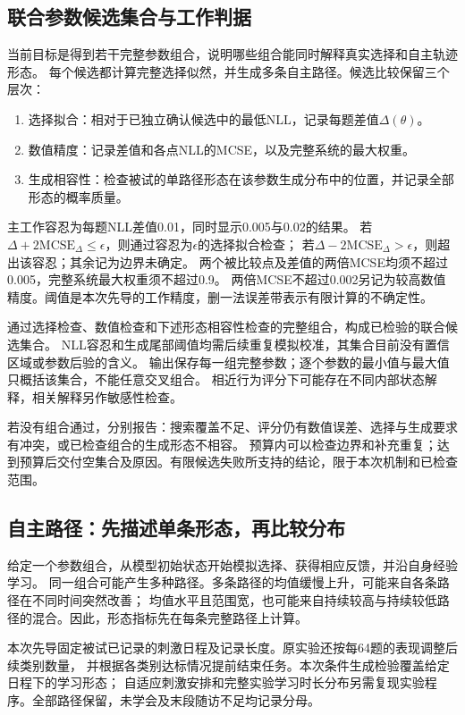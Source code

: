 \documentclass[11pt,a4paper]{article}
\numberwithin{equation}{section}
\begin{document}
\subsection{联合参数候选集合与工作判据}
\label{sec:selection}
当前目标是得到若干完整参数组合，说明哪些组合能同时解释真实选择和自主轨迹形态。
每个候选都计算完整选择似然，并生成多条自主路径。候选比较保留三个层次：
\begin{enumerate}
\item 选择拟合：相对于已独立确认候选中的最低NLL，记录每题差值$\Delta(\theta)$。
\item 数值精度：记录差值和各点NLL的MCSE，以及完整系统的最大权重。
\item 生成相容性：检查被试的单路径形态在该参数生成分布中的位置，并记录全部形态的概率质量。
\end{enumerate}
主工作容忍为每题NLL差值0.01，同时显示0.005与0.02的结果。
若$\Delta+2\mathrm{MCSE}_{\Delta}\leq\epsilon$，则通过容忍为$\epsilon$的选择拟合检查；
若$\Delta-2\mathrm{MCSE}_{\Delta}>\epsilon$，则超出该容忍；其余记为边界未确定。
两个被比较点及差值的两倍MCSE均须不超过0.005，完整系统最大权重须不超过0.9。
两倍MCSE不超过0.002另记为较高数值精度。阈值是本次先导的工作精度，删一法误差带表示有限计算的不确定性。

通过选择检查、数值检查和下述形态相容性检查的完整组合，构成已检验的联合候选集合。
NLL容忍和生成尾部阈值均需后续重复模拟校准，其集合目前没有置信区域或参数后验的含义。
输出保存每一组完整参数；逐个参数的最小值与最大值只概括该集合，不能任意交叉组合。
相近行为评分下可能存在不同内部状态解释，相关解释另作敏感性检查。

若没有组合通过，分别报告：搜索覆盖不足、评分仍有数值误差、选择与生成要求有冲突，或已检查组合的生成形态不相容。
预算内可以检查边界和补充重复；达到预算后交付空集合及原因。有限候选失败所支持的结论，限于本次机制和已检查范围。

\subsection{自主路径：先描述单条形态，再比较分布}
\label{sec:shape}
给定一个参数组合，从模型初始状态开始模拟选择、获得相应反馈，并沿自身经验学习。
同一组合可能产生多种路径。多条路径的均值缓慢上升，可能来自各条路径在不同时间突然改善；
均值水平且范围宽，也可能来自持续较高与持续较低路径的混合。因此，形态指标先在每条完整路径上计算。

本次先导固定被试已记录的刺激日程及记录长度。原实验还按每64题的表现调整后续类别数量，
并根据各类别达标情况提前结束任务。本次条件生成检验覆盖给定日程下的学习形态；
自适应刺激安排和完整实验学习时长分布另需复现实验程序。全部路径保留，未学会及末段随访不足均记录分母。
\end{document}
